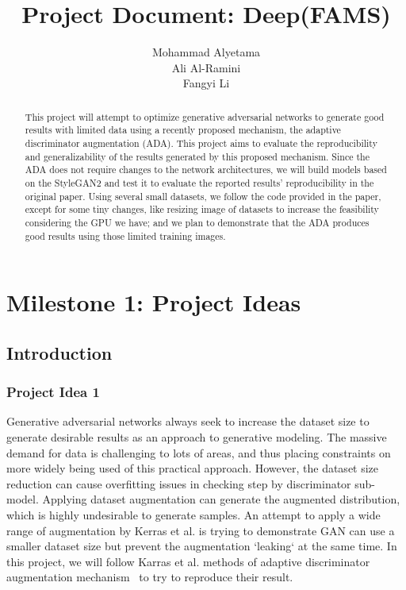 \documentclass{report}
\title{Project Document: Deep(FAMS)}
\author{Mohammad Alyetama \\
Ali Al-Ramini \\
Fangyi Li }
\date{}
\begin{document}
\maketitle

\tableofcontents

\begin{abstract}
This project will attempt to optimize generative adversarial networks to generate good results with limited data using a recently proposed mechanism, the adaptive discriminator augmentation (ADA). This project aims to evaluate the reproducibility and generalizability of the results generated by this proposed mechanism. Since the ADA does not require changes to the network architectures, we will build models based on the StyleGAN2 and test it to evaluate the reported results' reproducibility in the original paper. Using several small datasets, we follow the code provided in the paper, except for some tiny changes, like resizing image of datasets to increase the feasibility considering the GPU we have; and we plan to demonstrate that the ADA produces good results using those limited training images.
\end{abstract}

\chapter{Milestone 1: Project Ideas}

\section{Introduction}

\subsection{Project Idea 1}

Generative adversarial networks always seek to increase the dataset size to generate desirable results as an approach to generative modeling. The massive demand for data is challenging to lots of areas, and thus placing constraints on more widely being used of this practical approach. However, the dataset size reduction can cause overfitting issues in checking step by discriminator sub-model. Applying dataset augmentation can generate the augmented distribution, which is highly undesirable to generate samples.
An attempt to apply a wide range of augmentation by Kerras et al. is trying to demonstrate GAN can use a smaller dataset size but prevent the augmentation `leaking` at the same time. In this project, we will follow Karras et al. methods of adaptive discriminator augmentation mechanism~\cite{karras2020training} to try to reproduce their result.
\end{document}
